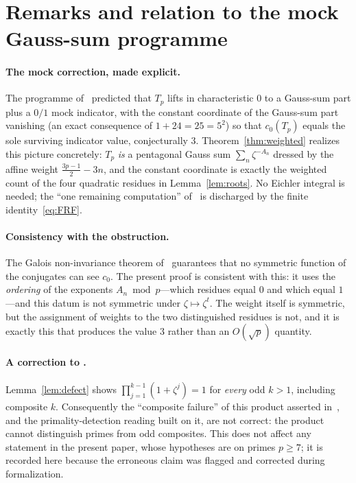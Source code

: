 \documentclass[11pt]{article}
\theoremstyle{definition}
\begin{document}
\section{Remarks and relation to the mock Gauss-sum programme}\label{sec:remarks}

\paragraph{The mock correction, made explicit.}
The programme of~\cite{Burke2026} predicted that $T_p$ lifts in characteristic $0$ to a Gauss-sum part plus a $0/1$ mock indicator, with the constant coordinate of the Gauss-sum part vanishing (an exact consequence of $1+24=25=5^{2}$) so that $c_0(T_p)$ equals the sole surviving indicator value, conjecturally $3$. Theorem~\ref{thm:weighted} realizes this picture concretely: $T_p$ \emph{is} a pentagonal Gauss sum $\sum_n\zeta^{-A_n}$ dressed by the affine weight $\tfrac{3p-1}{2}-3n$, and the constant coordinate is exactly the weighted count of the four quadratic residues in Lemma~\ref{lem:roots}. No Eichler integral is needed; the ``one remaining computation'' of~\cite{Burke2026} is discharged by the finite identity~\eqref{eq:FRF}.

\paragraph{Consistency with the obstruction.}
The Galois non-invariance theorem of~\cite{Burke2026} guarantees that no symmetric function of the conjugates can see $c_0$. The present proof is consistent with this: it uses the \emph{ordering} of the exponents $A_n\bmod p$---which residues equal $0$ and which equal $1$---and this datum is not symmetric under $\zeta\mapsto\zeta^{t}$. The weight itself is symmetric, but the assignment of weights to the two distinguished residues is not, and it is exactly this that produces the value $3$ rather than an $O(\sqrt p)$ quantity.

\paragraph{A correction to \cite{Burke2026}.}
Lemma~\ref{lem:defect} shows $\prod_{j=1}^{k-1}(1+\zeta^{j})=1$ for \emph{every} odd $k>1$, including composite $k$. Consequently the ``composite failure'' of this product asserted in~\cite{Burke2026}, and the primality-detection reading built on it, are not correct: the product cannot distinguish primes from odd composites. This does not affect any statement in the present paper, whose hypotheses are on primes $p\ge7$; it is recorded here because the erroneous claim was flagged and corrected during formalization.
\end{document}
